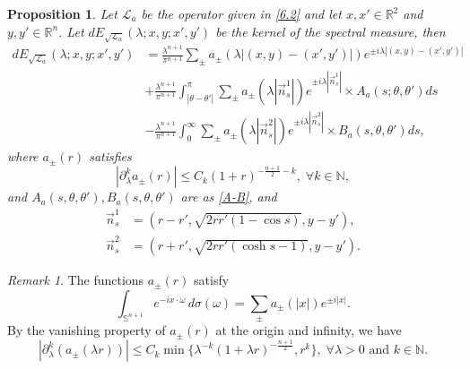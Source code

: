 \documentclass[a4paper,11pt, reqno]{amsart}
\numberwithin{equation}{section}
\theoremstyle{plain}
\newtheorem{proposition}[theorem]{Proposition}
\theoremstyle{definition}
\theoremstyle{remark}
\newtheorem{remark}[theorem]{Remark}
\begin{document}
\begin{proposition}\label{Prop 6.3}
Let $\mathcal{L}_a$ be the operator given in \eqref{6.2} and let $x,x'\in \mathbb{R}^2$ and $y, y' \in \mathbb{R}^n$. Let $dE_{\sqrt{\mathcal{L}_a}}(\lambda; x, y; x', y')$ be the kernel of the spectral measure, then
\begin{equation}\label{spectral}
\begin{aligned}
dE_{\sqrt{\mathcal{L}_a}}(\lambda; x, y; x', y') &= \frac{\lambda^{n+1}}{\pi^{n+1}} \sum_{\pm} a_{\pm}(\lambda|(x, y) - (x', y')|) e^{\pm i\lambda|(x, y) - (x', y')|}  \\
 &+ \frac{\lambda^{n+1}}{\pi^{n+1}} \int_{|\theta - \theta'|}^{\pi} \sum_{\pm} a_{\pm}(\lambda|\vec{n}_s^1|) e^{\pm i\lambda|\vec{n}_s^1|} \times A_a(s; \theta, \theta') ds  \\
&- \frac{\lambda^{n+1}}{\pi^{n+1}} \int_0^\infty \sum_{\pm} a_{\pm}(\lambda|\vec{n}_s^2|) e^{\pm i\lambda|\vec{n}_s^2|} \times B_a(s, \theta, \theta') ds, 
\end{aligned}
\end{equation}
where $a_{\pm}(r)$ satisfies
\begin{equation*}
|\partial_\lambda^k a_\pm(r)| \leq C_k (1 + r)^{-\frac{n+1}{2}-k}, \;\forall k\in\mathbb{N},
\end{equation*}
and $A_a(s, \theta, \theta'), B_a(s, \theta, \theta')$ are as \eqref{A-B},
and
\begin{align*}
\vec{n}_s^1 &= (r - r', \sqrt{2rr'(1-\cos s)}, y - y'), \\
\vec{n}_s^2 &= (r + r', \sqrt{2rr'(\cosh s - 1)}, y - y').
\end{align*}
\end{proposition}
\begin{remark}
The functions $a_\pm(r)$ satisfy
\begin{equation*}
\int_{\mathbb{S}^{n+1}} e^{-ix \cdot \omega} \, d\sigma(\omega) = \sum_{\pm} a_{\pm}(|x|) e^{\pm i|x|}.
\end{equation*}
By the vanishing property of $a_\pm(r)$ at the origin and infinity, we have
\begin{equation}\label{6.19}
|\partial_\lambda^k(a_\pm(\lambda r))| \leq C_k\min\{\lambda^{-k} (1 + \lambda r)^{-\frac{n+1}{2}}, r^k\}, \;\forall \lambda>0 \text{ and } k\in\mathbb{N}.
\end{equation}
\end{remark}

\end{document}
